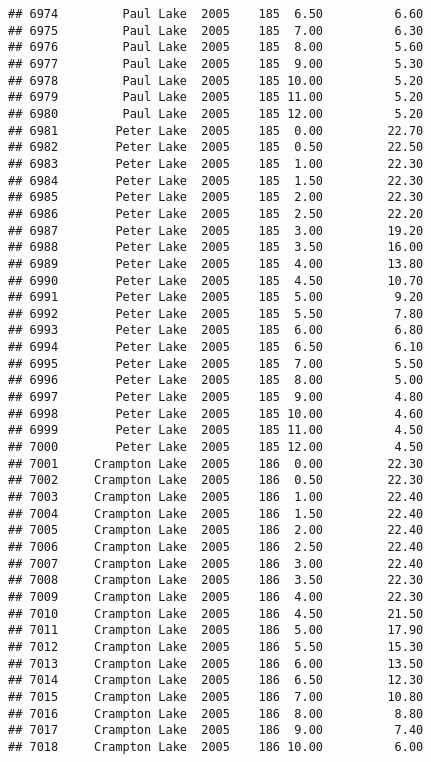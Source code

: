 \documentclass[
]{article}
\begin{document}
\begin{verbatim}
## 6974         Paul Lake  2005    185  6.50          6.60
## 6975         Paul Lake  2005    185  7.00          6.30
## 6976         Paul Lake  2005    185  8.00          5.60
## 6977         Paul Lake  2005    185  9.00          5.30
## 6978         Paul Lake  2005    185 10.00          5.20
## 6979         Paul Lake  2005    185 11.00          5.20
## 6980         Paul Lake  2005    185 12.00          5.20
## 6981        Peter Lake  2005    185  0.00         22.70
## 6982        Peter Lake  2005    185  0.50         22.50
## 6983        Peter Lake  2005    185  1.00         22.30
## 6984        Peter Lake  2005    185  1.50         22.30
## 6985        Peter Lake  2005    185  2.00         22.30
## 6986        Peter Lake  2005    185  2.50         22.20
## 6987        Peter Lake  2005    185  3.00         19.20
## 6988        Peter Lake  2005    185  3.50         16.00
## 6989        Peter Lake  2005    185  4.00         13.80
## 6990        Peter Lake  2005    185  4.50         10.70
## 6991        Peter Lake  2005    185  5.00          9.20
## 6992        Peter Lake  2005    185  5.50          7.80
## 6993        Peter Lake  2005    185  6.00          6.80
## 6994        Peter Lake  2005    185  6.50          6.10
## 6995        Peter Lake  2005    185  7.00          5.50
## 6996        Peter Lake  2005    185  8.00          5.00
## 6997        Peter Lake  2005    185  9.00          4.80
## 6998        Peter Lake  2005    185 10.00          4.60
## 6999        Peter Lake  2005    185 11.00          4.50
## 7000        Peter Lake  2005    185 12.00          4.50
## 7001     Crampton Lake  2005    186  0.00         22.30
## 7002     Crampton Lake  2005    186  0.50         22.30
## 7003     Crampton Lake  2005    186  1.00         22.40
## 7004     Crampton Lake  2005    186  1.50         22.40
## 7005     Crampton Lake  2005    186  2.00         22.40
## 7006     Crampton Lake  2005    186  2.50         22.40
## 7007     Crampton Lake  2005    186  3.00         22.40
## 7008     Crampton Lake  2005    186  3.50         22.30
## 7009     Crampton Lake  2005    186  4.00         22.30
## 7010     Crampton Lake  2005    186  4.50         21.50
## 7011     Crampton Lake  2005    186  5.00         17.90
## 7012     Crampton Lake  2005    186  5.50         15.30
## 7013     Crampton Lake  2005    186  6.00         13.50
## 7014     Crampton Lake  2005    186  6.50         12.30
## 7015     Crampton Lake  2005    186  7.00         10.80
## 7016     Crampton Lake  2005    186  8.00          8.80
## 7017     Crampton Lake  2005    186  9.00          7.40
## 7018     Crampton Lake  2005    186 10.00          6.00

\end{verbatim}
\end{document}
